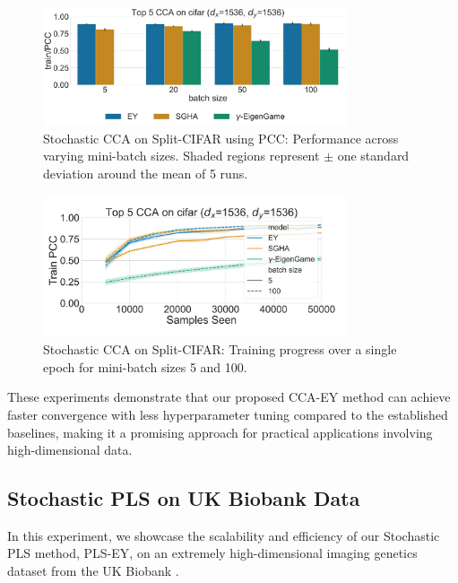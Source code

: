 \begin{figure}
\centering
\includegraphics[width=0.8\textwidth]{figures/CCA/cifar_models_different_batch_sizes}
\caption{Stochastic CCA on Split-CIFAR using PCC: Performance across varying mini-batch sizes. Shaded regions represent $\pm$ one standard deviation around the mean of 5 runs.}
\label{fig:corr_cifar}
\end{figure}
\begin{figure}
\centering
\includegraphics[width=0.8\textwidth]{figures/CCA/cifar_allbatchsizes_pcc}
\caption{Stochastic CCA on Split-CIFAR: Training progress over a single epoch for mini-batch sizes 5 and 100.}
\label{fig:learningcurve_cifar}
\end{figure}
These experiments demonstrate that our proposed CCA-EY method can achieve faster convergence with less hyperparameter tuning compared to the established baselines, making it a promising approach for practical applications involving high-dimensional data.

\subsection{Stochastic PLS on UK Biobank Data}
In this experiment, we showcase the scalability and efficiency of our Stochastic PLS method, PLS-EY, on an extremely high-dimensional imaging genetics dataset from the UK Biobank \citep{sudlow2015uk}.
